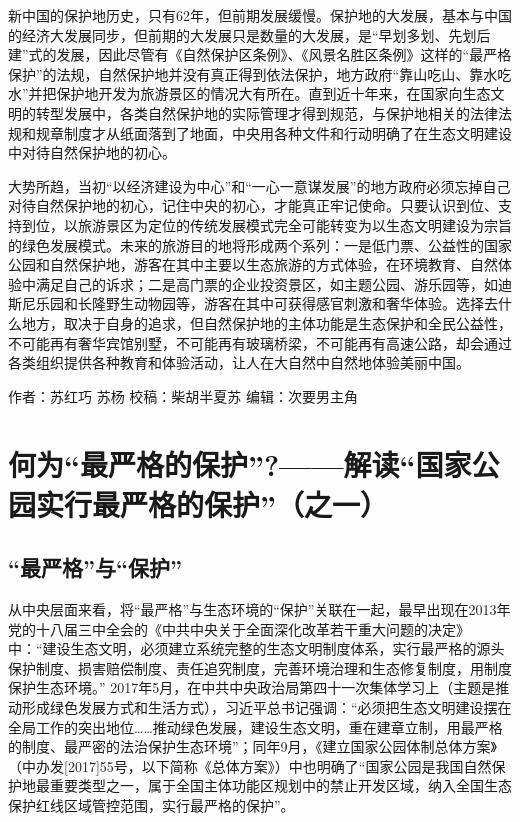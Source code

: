 \documentclass[
]{book}
\begin{document}
新中国的保护地历史，只有62年，但前期发展缓慢。保护地的大发展，基本与中国的经济大发展同步，但前期的大发展只是数量的大发展，是``早划多划、先划后建''式的发展，因此尽管有《自然保护区条例》、《风景名胜区条例》这样的``最严格保护''的法规，自然保护地并没有真正得到依法保护，地方政府``靠山吃山、靠水吃水''并把保护地开发为旅游景区的情况大有所在。直到近十年来，在国家向生态文明的转型发展中，各类自然保护地的实际管理才得到规范，与保护地相关的法律法规和规章制度才从纸面落到了地面，中央用各种文件和行动明确了在生态文明建设中对待自然保护地的初心。

大势所趋，当初``以经济建设为中心''和``一心一意谋发展''的地方政府必须忘掉自己对待自然保护地的初心，记住中央的初心，才能真正牢记使命。只要认识到位、支持到位，以旅游景区为定位的传统发展模式完全可能转变为以生态文明建设为宗旨的绿色发展模式。未来的旅游目的地将形成两个系列：一是低门票、公益性的国家公园和自然保护地，游客在其中主要以生态旅游的方式体验，在环境教育、自然体验中满足自己的诉求；二是高门票的企业投资景区，如主题公园、游乐园等，如迪斯尼乐园和长隆野生动物园等，游客在其中可获得感官刺激和奢华体验。选择去什么地方，取决于自身的追求，但自然保护地的主体功能是生态保护和全民公益性，不可能再有奢华宾馆别墅，不可能再有玻璃桥梁，不可能再有高速公路，却会通过各类组织提供各种教育和体验活动，让人在大自然中自然地体验美丽中国。

作者：苏红巧 苏杨
校稿：柴胡半夏苏
编辑：次要男主角

\hypertarget{ux4f55ux4e3aux6700ux4e25ux683cux7684ux4fddux62a4ux89e3ux8bfbux56fdux5bb6ux516cux56edux5b9eux884cux6700ux4e25ux683cux7684ux4fddux62a4ux4e4bux4e00}{%
\section{何为``最严格的保护''?------解读``国家公园实行最严格的保护''（之一）}\label{ux4f55ux4e3aux6700ux4e25ux683cux7684ux4fddux62a4ux89e3ux8bfbux56fdux5bb6ux516cux56edux5b9eux884cux6700ux4e25ux683cux7684ux4fddux62a4ux4e4bux4e00}}

\hypertarget{ux6700ux4e25ux683cux4e0eux4fddux62a4}{%
\subsection{``最严格''与``保护''}\label{ux6700ux4e25ux683cux4e0eux4fddux62a4}}

从中央层面来看，将``最严格''与生态环境的``保护''关联在一起，最早出现在2013年党的十八届三中全会的《中共中央关于全面深化改革若干重大问题的决定》中：``建设生态文明，必须建立系统完整的生态文明制度体系，实行最严格的源头保护制度、损害赔偿制度、责任追究制度，完善环境治理和生态修复制度，用制度保护生态环境。'' 2017年5月，在中共中央政治局第四十一次集体学习上（主题是推动形成绿色发展方式和生活方式），习近平总书记强调：``必须把生态文明建设摆在全局工作的突出地位\ldots\ldots 推动绿色发展，建设生态文明，重在建章立制，用最严格的制度、最严密的法治保护生态环境''；同年9月，《建立国家公园体制总体方案》（中办发{[}2017{]}55号，以下简称《总体方案》）中也明确了``国家公园是我国自然保护地最重要类型之一，属于全国主体功能区规划中的禁止开发区域，纳入全国生态保护红线区域管控范围，实行最严格的保护''。
\end{document}
